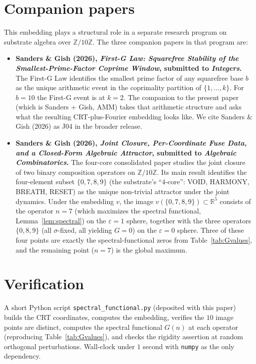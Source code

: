 \documentclass[11pt,reqno]{amsart}
\theoremstyle{definition}
\newcommand{\Z}{\mathbb{Z}}
\newcommand{\R}{\mathbb{R}}
\begin{document}
\section{Companion papers}
\label{sec:companions}

This embedding plays a structural role in a separate research
program on substrate algebra over $\Z/10\Z$. The three
companion papers in that program are:

\begin{itemize}[leftmargin=*]
\item \textbf{Sanders \& Gish (2026), \emph{First-G Law: Squarefree
  Stability of the Smallest-Prime-Factor Coprime Window},
  submitted to \emph{Integers}.} The First-G Law identifies the
  smallest prime factor of any squarefree base $b$ as the unique
  arithmetic event in the coprimality partition of
  $\{1, \ldots, k\}$. For $b = 10$ the First-G event is at
  $k = 2$. The companion to the present paper (which is
  Sanders + Gish, AMM) takes that arithmetic structure and asks
  what the resulting CRT-plus-Fourier embedding looks like. We
  cite Sanders \& Gish (2026) as J04 in the broader release.
\item \textbf{Sanders \& Gish (2026), \emph{Joint Closure,
  Per-Coordinate Fuse Data, and a Closed-Form Algebraic Attractor},
  submitted to \emph{Algebraic Combinatorics}.} The four-core
  consolidated paper studies the joint closure of two binary
  composition operators on $\Z/10\Z$. Its main result identifies
  the four-element subset $\{0, 7, 8, 9\}$ (the substrate's
  ``$4$-core'': VOID, HARMONY, BREATH, RESET) as the unique
  non-trivial attractor under the joint dynamics. Under the
  embedding $v$, the image $v(\{0, 7, 8, 9\}) \subset \R^{5}$
  consists of the operator $n = 7$ (which maximizes the spectral
  functional, Lemma~\ref{lem:spectral}) on the
  $\varepsilon = 1$ sphere, together with the three operators
  $\{0, 8, 9\}$ (all $\sigma$-fixed, all yielding $G = 0$) on the
  $\varepsilon = 0$ sphere. Three of these four points are exactly
  the spectral-functional zeros from
  Table~\ref{tab:Gvalues}, and the remaining point ($n = 7$) is
  the global maximum.
\end{itemize}

\section*{Verification}

A short Python script \texttt{spectral\_functional.py} (deposited
with this paper) builds the CRT coordinates, computes the
embedding, verifies the $10$ image points are distinct, computes
the spectral functional $G(n)$ at each operator (reproducing
Table~\ref{tab:Gvalues}), and checks the rigidity assertion at
random orthogonal perturbations. Wall-clock under $1$ second with
\texttt{numpy} as the only dependency.
\end{document}
